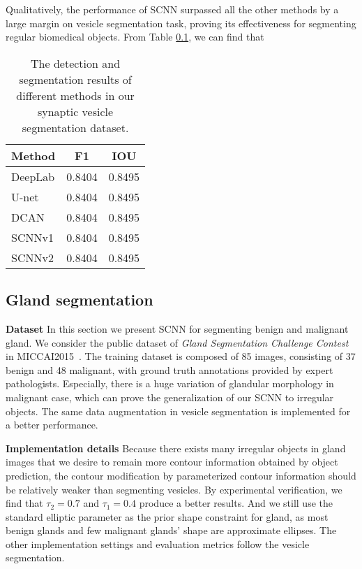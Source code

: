Qualitatively, the performance of SCNN surpassed all the other methods by a large margin on vesicle segmentation task, proving its effectiveness for segmenting regular biomedical objects.
From Table \ref{}, we can find that

\begin{table}\label{tab:vesicle}
\begin{center}
\begin{tabular}{lcc}
\hline
Method & F1 & IOU \\
\hline
DeepLab & 0.8404 & 0.8495 \\
U-net & 0.8404 & 0.8495 \\
DCAN & 0.8404 & 0.8495 \\
SCNNv1 & 0.8404 & 0.8495 \\
SCNNv2 & 0.8404 & 0.8495 \\
\hline
\end{tabular}
\end{center}
\caption{The detection and segmentation results of different methods in our synaptic vesicle segmentation dataset. }
\end{table}





\subsection{Gland segmentation}
\textbf{Dataset}
In this section we present SCNN for segmenting benign and malignant gland.
We consider the public dataset of \emph{Gland Segmentation Challenge Contest} in MICCAI2015~\cite{Sirinukunwattana2015a}.
%
The training dataset is composed of 85 images, consisting of 37 benign and 48 malignant, with ground truth annotations provided by expert pathologists.
Especially, there is a huge variation of glandular morphology in malignant case, which can prove the generalization of our SCNN to irregular objects.
The same data augmentation in vesicle segmentation is implemented for a better performance.

\textbf{Implementation details}
Because there exists many irregular objects in gland images that we desire to remain more contour information obtained by object prediction, the contour modification by parameterized contour information should be relatively weaker than segmenting vesicles.
By experimental verification, we find that $\tau_2=0.7$ and $\tau_1=0.4 $ produce a better results.
%
And we still use the standard elliptic parameter as the prior shape constraint for gland, as most benign glands and few malignant glands' shape are approximate ellipses.
The other implementation settings and evaluation metrics follow the vesicle segmentation.

